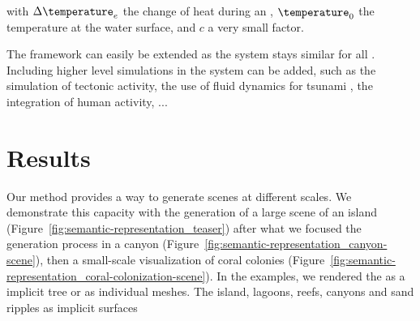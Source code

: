 with $\Delta \temperature_e$ the change of heat during an , $\temperature_0$ the temperature at the water surface, and $c$ a very small factor.

The framework can easily be extended as the  system stays similar for all . Including higher level simulations in the  system can be added, such as the simulation of tectonic activity, the use of fluid dynamics for tsunami , the integration of human activity, ...

\section{Results}
\label{sec:semantic-representation_results}
Our method provides a way to generate scenes at different scales. We demonstrate this capacity with the generation of a large scene of an island (Figure~\ref{fig:semantic-representation_teaser}) after what we focused the generation process in a canyon (Figure~\ref{fig:semantic-representation_canyon-scene}), then a small-scale visualization of coral colonies (Figure~\ref{fig:semantic-representation_coral-colonization-scene}).
In the examples, we rendered the  as a implicit tree or as individual meshes. The island, lagoons, reefs, canyons and sand ripples as implicit surfaces

